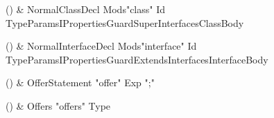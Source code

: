 \begin{bbgrammarappendix}

() & NormalClassDecl \label{prod:NormalClassDecl}  \: Mods\opt \xcd"class" Id TypeParamsI\opt Properties\opt Guard\opt Super\opt Interfaces\opt ClassBody  \\


\end{bbgrammarappendix}

\begin{bbgrammarappendix}

() & NormalInterfaceDecl \label{prod:NormalInterfaceDecl}  \: Mods\opt \xcd"interface" Id TypeParamsI\opt Properties\opt Guard\opt ExtendsInterfaces\opt InterfaceBody  \\


\end{bbgrammarappendix}

\begin{bbgrammarappendix}

() & OfferStatement \label{prod:OfferStatement}  \: \xcd"offer" Exp \xcd";"  \\


\end{bbgrammarappendix}

\begin{bbgrammarappendix}

() & Offers \label{prod:Offers}  \: \xcd"offers" Type  \\


\end{bbgrammarappendix}


